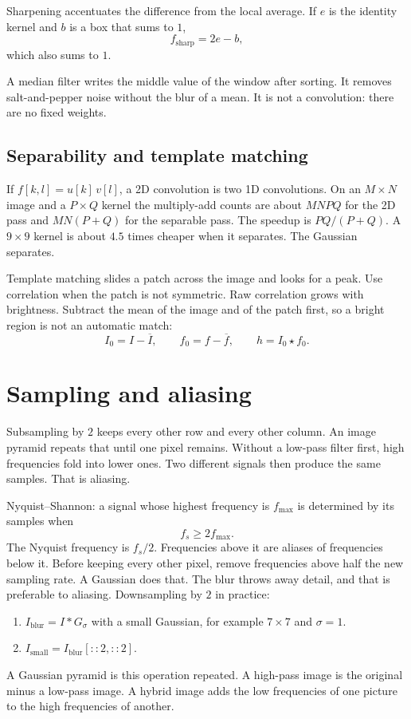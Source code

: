 \documentclass[11pt]{article}
\newcommand{\img}{I}
\newcommand{\filt}{f}
\newcommand{\outp}{h}
\newcommand{\conv}{\ast}
\newcommand{\corr}{\star}
\begin{document}
Sharpening accentuates the difference from the local average. If $e$ is the identity kernel and $b$ is a box that sums to $1$,
\begin{equation}
\filt_{\mathrm{sharp}}=2e-b,
\end{equation}
which also sums to $1$.

A median filter writes the middle value of the window after sorting. It removes salt-and-pepper noise without the blur of a mean. It is not a convolution: there are no fixed weights.

\subsection{Separability and template matching}

If $\filt[k,l]=u[k]\,v[l]$, a 2D convolution is two 1D convolutions. On an $M\times N$ image and a $P\times Q$ kernel the multiply-add counts are about $MNPQ$ for the 2D pass and $MN(P+Q)$ for the separable pass. The speedup is $PQ/(P+Q)$. A $9\times 9$ kernel is about $4.5$ times cheaper when it separates. The Gaussian separates.

Template matching slides a patch across the image and looks for a peak. Use correlation when the patch is not symmetric. Raw correlation grows with brightness. Subtract the mean of the image and of the patch first, so a bright region is not an automatic match:
\begin{equation}
\img_0=\img-\overline{\img},
\qquad
\filt_0=\filt-\overline{\filt},
\qquad
\outp=\img_0\corr\filt_0.
\end{equation}

\section{Sampling and aliasing}

Subsampling by $2$ keeps every other row and every other column. An image pyramid repeats that until one pixel remains. Without a low-pass filter first, high frequencies fold into lower ones. Two different signals then produce the same samples. That is aliasing.

Nyquist--Shannon: a signal whose highest frequency is $f_{\max}$ is determined by its samples when
\begin{equation}
f_s\ge 2f_{\max}.
\end{equation}
The Nyquist frequency is $f_s/2$. Frequencies above it are aliases of frequencies below it. Before keeping every other pixel, remove frequencies above half the new sampling rate. A Gaussian does that. The blur throws away detail, and that is preferable to aliasing. Downsampling by $2$ in practice:
\begin{enumerate}
\item $\img_{\mathrm{blur}}=\img\conv G_\sigma$ with a small Gaussian, for example $7\times 7$ and $\sigma=1$.
\item $\img_{\mathrm{small}}=\img_{\mathrm{blur}}[::2,::2]$.
\end{enumerate}
A Gaussian pyramid is this operation repeated. A high-pass image is the original minus a low-pass image. A hybrid image adds the low frequencies of one picture to the high frequencies of another.
\end{document}
